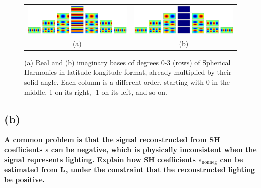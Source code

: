 \documentclass{report}
\begin{document}
\begin{figure}
  \centering
  \begin{tabular}{cc}
  \includegraphics[width=0.45\linewidth]{q8_a_pyramid_real.png} &
  \includegraphics[width=0.45\linewidth]{q8_a_pyramid_imag.png} \\
  (a) & (b)
  \end{tabular}
  \caption[Sample Spherical Harmonics]
   {(a) Real and (b) imaginary bases of degrees 0-3 (rows) of Spherical Harmonics in latitude-longitude format, already multiplied by their solid angle. Each column is a different order, starting with 0 in the middle, 1 on its right, -1 on its left, and so on.}
   \label{q8a:sh_ex}
\end{figure}




\subsection{(b)}
\textbf{A common problem is that the signal reconstructed from SH coefficients $s$ can be negative, which is physically inconsistent when the signal represents lighting. Explain how SH coefficients $s_{\text{nonneg}}$ can be estimated from $\mathbf{L}$, under the constraint that the reconstructed lighting be positive.}
\end{document}
